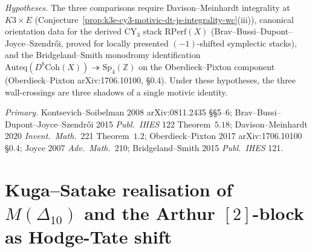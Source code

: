 \begin{remark}
\emph{Hypotheses.} The three comparisons require Davison--Meinhardt integrality at $K3 \times E$ (Conjecture~\ref{prop:k3e-cy3-motivic-dt-js-integrality-wc}(iii)), canonical orientation data for the derived CY$_3$ stack $\mathrm{RPerf}(X)$ (Brav--Bussi--Dupont--Joyce--Szendr\H oi, proved for locally presented $(-1)$-shifted symplectic stacks), and the Bridgeland--Smith monodromy identification $\mathrm{Auteq}(D^b\mathrm{Coh}(X)) \twoheadrightarrow \mathrm{Sp}_4(\mathbb Z)$ on the Oberdieck--Pixton component (Oberdieck--Pixton arXiv:1706.10100, \S 0.4). Under these hypotheses, the three wall-crossings are three shadows of a single motivic identity.

\emph{Primary.}
Kontsevich--Soibelman 2008 arXiv:0811.2435 \S\S5--6;
Brav--Bussi--Dupont--Joyce--Szendr\H oi 2015 \emph{Publ.\ IHES} 122 Theorem~$5.18$;
Davison--Meinhardt 2020 \emph{Invent.\ Math.}\ 221 Theorem~$1.2$;
Oberdieck--Pixton 2017 arXiv:1706.10100 \S 0.4;
Joyce 2007 \emph{Adv.\ Math.}\ 210;
Bridgeland--Smith 2015 \emph{Publ.\ IHES} 121.
\end{remark}

\section{Kuga--Satake realisation of \texorpdfstring{$M(\Delta_{10})$}{M(Delta-10)} and the Arthur \texorpdfstring{$[2]$}{[2]}-block as Hodge-Tate shift}
\label{sec:k3e-cy3-kuga-satake-delta10}

